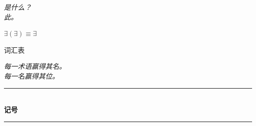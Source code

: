 \documentclass[10pt, openany, oneside]{book}
\renewcommand{\normalsize}{\fontsize{10}{13}\selectfont}
\renewcommand{\huge}{\fontsize{17}{21}\selectfont}
\begin{document}
\vspace{0.5em}

\begin{center}
    \itshape
    是什么？\\[0.8em]
    此。
\end{center}

\vspace{1.5em}

\begin{center}
    \bfseries\itshape
    $\exists(\exists) \equiv \exists$
\end{center}


%
%
%

\newpage

\begin{center}
    {\huge\scshape 词汇表}
\end{center}

\vspace{1.5em}

\begin{center}
    \itshape
    每一术语赢得其名。\\
    每一名赢得其位。
\end{center}

\vspace{2em}


\begin{center}
    \rule{0.3\textwidth}{0.4pt}\\[0.5em]
    {\normalsize\bfseries\scshape 记号}\\[0.3em]
    \rule{0.3\textwidth}{0.4pt}
\end{center}

\vspace{1em}
\end{document}
